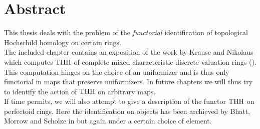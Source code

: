 \chapter*{Abstract}
This thesis deals with the problem of the \textit{functorial} identification of topological Hochschild homology on certain rings. \\
The included chapter contains an exposition of the work by Krause and Nikolaus which computes $\operatorname{THH}$ of complete mixed characteristic discrete valuation rings (\cite{KN}). This computation hinges on the choice of an uniformizer and is thus only functorial in maps that preserve uniformizers.
In future chapters we will thus try to identify the action of $\operatorname{THH}$ on arbitrary maps. 
\\
If time permits, we will also attempt to give a description of the functor $\operatorname{THH}$ on perfectoid rings. Here the identification on objects has been archieved by Bhatt, Morrow and Scholze in \cite[Chapter~6]{BMS2} but again under a certain choice of element.
